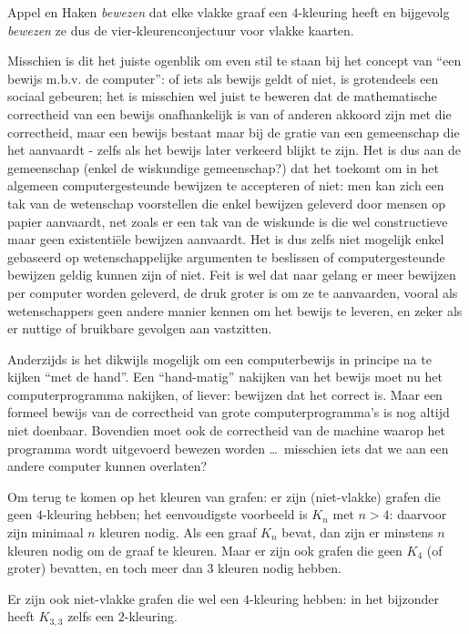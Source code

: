 Appel en Haken {\em bewezen} dat elke vlakke graaf een $4$-kleuring heeft en
bijgevolg {\em bewezen} ze dus de vier-kleurenconjectuur voor vlakke kaarten.

Misschien is dit het juiste ogenblik om even stil te staan bij het
concept van ``een bewijs m.b.v. de computer'': of iets als bewijs
geldt of niet, is grotendeels een sociaal gebeuren; het is misschien
wel juist te beweren dat de mathematische correctheid van een bewijs
onafhankelijk is van of anderen akkoord zijn met die correctheid, maar
een bewijs bestaat maar bij de gratie van een gemeenschap die het
aanvaardt - zelfs als het bewijs later verkeerd blijkt te zijn. Het is
dus aan de gemeenschap (enkel de wiskundige gemeenschap?) dat het
toekomt om in het algemeen computergesteunde bewijzen te accepteren of
niet: men kan zich een tak van de wetenschap voorstellen die enkel
bewijzen geleverd door mensen op papier aanvaardt, net zoals er een tak van
de wiskunde is die wel constructieve maar geen existenti\"{e}le bewijzen
aanvaardt. Het is dus zelfs niet mogelijk enkel gebaseerd op
wetenschappelijke argumenten te beslissen of computergesteunde
bewijzen geldig kunnen zijn of niet. Feit is wel dat naar gelang er
meer bewijzen per computer worden geleverd, de druk groter is om ze te
aanvaarden, vooral als wetenschappers geen andere manier kennen om het
bewijs te leveren, en zeker als er nuttige of bruikbare gevolgen aan
vastzitten.


Anderzijds is het dikwijls mogelijk om een computerbewijs in
principe na te kijken ``met de hand''. 
Een ``hand-matig'' nakijken van het bewijs moet nu het
computerprogramma nakijken, of liever: bewijzen dat het correct is.
Maar een formeel bewijs van de correctheid van grote
computerprogramma's is nog altijd niet doenbaar. Bovendien moet ook de
correctheid van de machine waarop het programma wordt uitgevoerd
bewezen worden \ldots\ misschien iets dat we aan een andere computer kunnen
overlaten?

Om terug te komen op het kleuren van grafen: er zijn (niet-vlakke)
grafen die geen $4$-kleuring hebben; het eenvoudigste voorbeeld is
$K_{n}$ met $n > 4$: daarvoor zijn minimaal $n$ kleuren nodig. Als een
graaf $K_n$ bevat, dan zijn er minstens $n$ kleuren nodig om de graaf
te kleuren. Maar er zijn ook grafen die geen $K_4$ (of groter)
bevatten, en toch meer dan 3 kleuren nodig hebben.

Er zijn ook niet-vlakke grafen die wel een $4$-kleuring hebben: in het
bijzonder heeft $K_{3,3}$ zelfs een $2$-kleuring.

